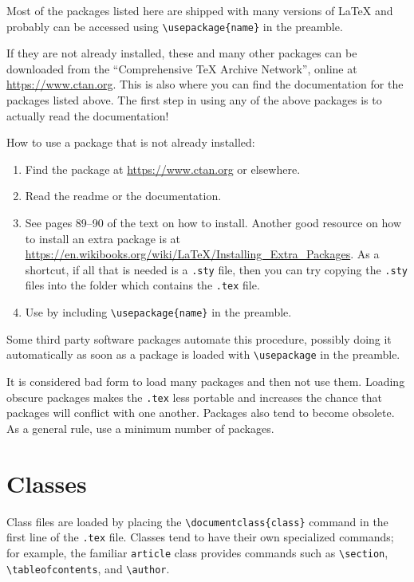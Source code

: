 \documentclass{paper}
\begin{document}
Most of the packages listed here are shipped with many versions of \LaTeX{} 
and probably can be accessed using \verb~\usepackage{name}~ in the 
preamble.  

If they are not already installed, these and many other packages can be downloaded from 
the ``Comprehensive \TeX{} Archive Network'', online at \url{https://www.ctan.org}.  This is also 
where you can find the documentation for the packages listed above.  The first step in using any 
of the above packages is to actually read the documentation!

How to use a package that is not already installed:
\begin{enumerate}[labelindent = \parindent,
  leftmargin = *,
  label={\arabic*.}] %
\item Find the package at \url{https://www.ctan.org} or elsewhere.
\item Read the readme or the documentation.
\item See pages 89--90 of the text on how to install.  Another good resource on how to install 
an extra package is at
\url{https://en.wikibooks.org/wiki/LaTeX/Installing_Extra_Packages}.  
As a shortcut, if all that is needed is a \verb~.sty~ file, then you can try copying 
the \verb~.sty~ files into the folder which contains the \verb~.tex~ file. 
\item Use by including \verb~\usepackage{name}~ in the preamble.  
\end{enumerate}
Some third party software packages automate this procedure, possibly doing it automatically as
soon as a package is loaded with \verb~\usepackage~ in the preamble.  

It is considered bad form to load many packages and then not use them.  Loading obscure packages 
makes the \verb~.tex~ less portable and increases the chance that packages will conflict with one 
another.  Packages also tend to become obsolete.  As a general rule, use a minimum number 
of packages.

\section{Classes}

Class files are loaded by placing the \verb~\documentclass{class}~ command in the first line of
the \verb~.tex~ file.  Classes tend to have their own specialized commands; for example, the
familiar \verb~article~ class provides commands such as 
\verb~\section~, \verb~\tableofcontents~, and \verb~\author~. 
\end{document}
